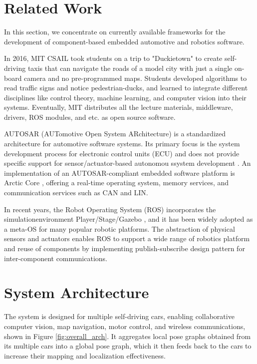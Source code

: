 \documentclass[conference]{IEEEtran}
\begin{document}
\section{Related Work}

In this section, we concentrate on currently available frameworks for the development of component-based embedded automotive and robotics software.

In 2016, MIT CSAIL took students on a trip to "Duckietown" \cite{Duckietown} to create self-driving taxis that can navigate the roads of a model city with just a single on-board camera and no pre-programmed maps. Students developed algorithms to read traffic signs and notice pedestrian-ducks, and learned to integrate different disciplines like control theory, machine learning, and computer vision into their systems. Eventually, MIT distributes all the lecture materials, middleware, drivers, ROS modules, and etc. as open source software.

AUTOSAR (AUTomotive Open System ARchitecture) is a standardized architecture for automotive software systems. Its primary focus is the system development process for electronic control units (ECU) and does not provide specific support for sensor/actuator-based autonomou ssystem development \cite{rtes}. An implementation of an AUTOSAR-compliant embedded software platform is Arctic Core \cite{arctic-core}, offering a real-time operating system, memory services, and communication services such as CAN and LIN.

In recent years, the Robot Operating System (ROS) \cite{ROS} incorporates the simulationenvironment Player/Stage/Gazebo \cite{player/stage}, and it has been widely adopted as a meta-OS for many popular robotic platforms. The abstraction of physical sensors and actuators enables ROS to support a wide range of robotics platform and reuse of components by implementing publish-subscribe design pattern for inter-component communications.

\section{System Architecture}

The system is designed for multiple self-driving cars, enabling collaborative computer vision, map navigation, motor control, and wireless communications, shown in Figure \ref{fig:overall_arch}. It aggregates local pose graphs obtained from its multiple cars into a global pose graph, which it then feeds back to the cars to increase their mapping and localization effectiveness.
\end{document}
